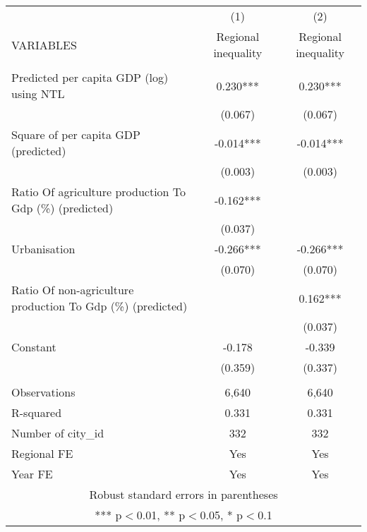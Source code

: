 \documentclass[]{article}
\begin{document}
\begin{tabular}{lcc} \hline
 & (1) & (2) \\
VARIABLES & Regional inequality & Regional inequality \\ \hline
 &  &  \\
Predicted per capita GDP (log) using NTL & 0.230*** & 0.230*** \\
 & (0.067) & (0.067) \\
Square of per capita GDP (predicted) & -0.014*** & -0.014*** \\
 & (0.003) & (0.003) \\
Ratio Of agriculture production To Gdp (\%) (predicted) & -0.162*** &  \\
 & (0.037) &  \\
Urbanisation & -0.266*** & -0.266*** \\
 & (0.070) & (0.070) \\
Ratio Of non-agriculture production To Gdp (\%) (predicted) &  & 0.162*** \\
 &  & (0.037) \\
Constant & -0.178 & -0.339 \\
 & (0.359) & (0.337) \\
 &  &  \\
Observations & 6,640 & 6,640 \\
R-squared & 0.331 & 0.331 \\
Number of city\_id & 332 & 332 \\
Regional FE & Yes & Yes \\
 Year FE & Yes & Yes \\ \hline
\multicolumn{3}{c}{ Robust standard errors in parentheses} \\
\multicolumn{3}{c}{ *** p$<$0.01, ** p$<$0.05, * p$<$0.1} \\
\end{tabular}
\end{document}
